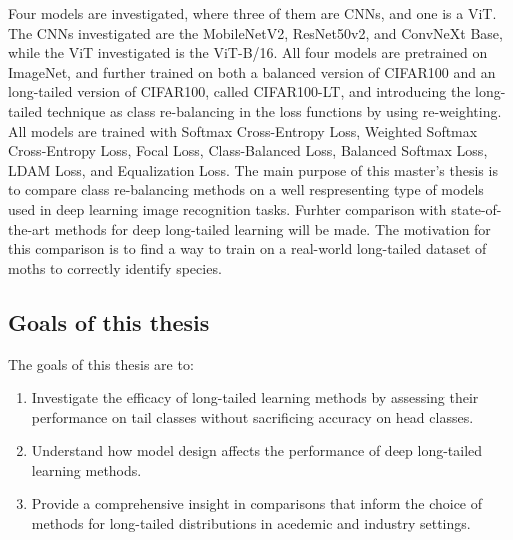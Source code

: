 Four models are investigated, where three of them are CNNs, and one is a ViT. The CNNs investigated are the MobileNetV2, ResNet50v2, and ConvNeXt Base, while the ViT investigated is the ViT-B/16. All four models are pretrained on ImageNet, and further trained on both a balanced version of CIFAR100 and an long-tailed version of CIFAR100, called CIFAR100-LT, and introducing the long-tailed technique as class re-balancing in the loss functions by using re-weighting. All models are trained with Softmax Cross-Entropy Loss, Weighted Softmax Cross-Entropy Loss, Focal Loss, Class-Balanced Loss, Balanced Softmax Loss, LDAM Loss, and Equalization Loss. The main purpose of this master's thesis is to compare class re-balancing methods on a well respresenting type of models used in deep learning image recognition tasks. Furhter comparison with state-of-the-art methods for deep long-tailed learning will be made. The motivation for this comparison is to find a way to train on a real-world long-tailed dataset of moths to correctly identify species.




\subsection{Goals of this thesis}
The goals of this thesis are to:

\begin{enumerate}
    \item Investigate the efficacy of long-tailed learning methods by assessing their performance on tail classes without sacrificing accuracy on head classes. 
    \item Understand how model design affects the performance of deep long-tailed learning methods.
    \item Provide a comprehensive insight in comparisons that inform the choice of methods for long-tailed distributions in acedemic and industry settings.
\end{enumerate}

